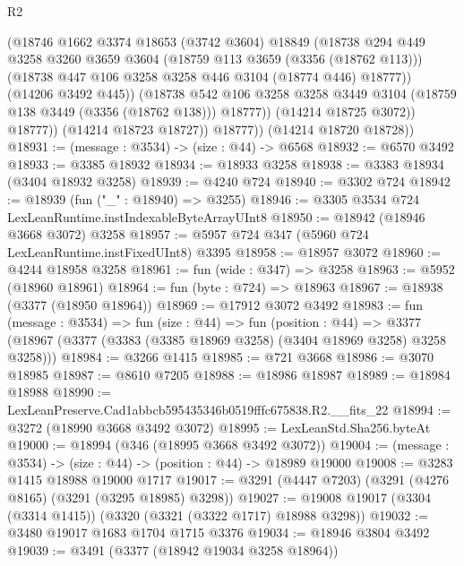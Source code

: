 \begin{lexlean}{R2}
\begin{coremodule}
                    (@18746
                      @1662
                      @3374
                      @18653
                      (@3742 @3604)
                      @18849
                      (@18738
                        @294
                        @449
                        @3258
                        @3260
                        @3659
                        @3604
                        (@18759 @113 @3659 (@3356 (@18762 @113)))
                        (@18738 @447 @106 @3258 @3258 @446 @3104 (@18774 @446) @18777))
                      (@14206 @3492 @445))
                    (@18738
                      @542
                      @106
                      @3258
                      @3258
                      @3449
                      @3104
                      (@18759 @138 @3449 (@3356 (@18762 @138)))
                      @18777))
                  (@14214 @18725 @3072))
                @18777))
            (@14214 @18723 @18727))
          @18777))
      (@14214 @18720 @18728))
@18931 := (message : @3534) -> (size : @44) -> @6568
@18932 := @6570 @3492
@18933 := @3385 @18932
@18934 := @18933 @3258
@18938 := @3383 @18934 (@3404 @18932 @3258)
@18939 := @4240 @724
@18940 := @3302 @724
@18942 := @18939 (fun ("_" : @18940) => @3255)
@18946 := @3305 @3534 @724 LexLeanRuntime.instIndexableByteArrayUInt8
@18950 := @18942 (@18946 @3668 @3072) @3258
@18957 := @5957 @724 @347 (@5960 @724 LexLeanRuntime.instFixedUInt8) @3395
@18958 := @18957 @3072
@18960 := @4244 @18958 @3258
@18961 := fun (wide : @347) => @3258
@18963 := @5952 (@18960 @18961)
@18964 := fun (byte : @724) => @18963
@18967 := @18938 (@3377 (@18950 @18964))
@18969 := @17912 @3072 @3492
@18983 := fun (message : @3534) =>
  fun (size : @44) =>
  fun (position : @44) =>
  @3377 (@18967 (@3377 (@3383 (@3385 @18969 @3258) (@3404 @18969 @3258) @3258 @3258)))
@18984 := @3266 @1415
@18985 := @721 @3668
@18986 := @3070 @18985
@18987 := @8610 @7205
@18988 := @18986 @18987
@18989 := @18984 @18988
@18990 := LexLeanPreserve.Cad1abbcb595435346b0519fffc675838.R2.__fits_22
@18994 := @3272 (@18990 @3668 @3492 @3072)
@18995 := LexLeanStd.Sha256.byteAt
@19000 := @18994 (@346 (@18995 @3668 @3492 @3072))
@19004 := (message : @3534) -> (size : @44) -> (position : @44) -> @18989 @19000
@19008 := @3283 @1415 @18988 @19000 @1717
@19017 := @3291 (@4447 @7203) (@3291 (@4276 @8165) (@3291 (@3295 @18985) @3298))
@19027 := @19008 @19017 (@3304 (@3314 @1415)) (@3320 (@3321 (@3322 @1717) @18988 @3298))
@19032 := @3480 @19017 @1683 @1704 @1715 @3376
@19034 := @18946 @3804 @3492
@19039 := @3491 (@3377 (@18942 @19034 @3258 @18964))

\end{coremodule}
\end{lexlean}
